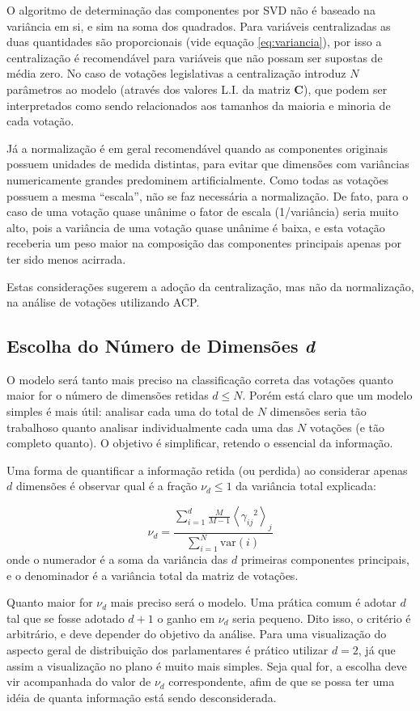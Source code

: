 \documentclass[a4paper, 12pt]{article}
\begin{document}
O algoritmo de determinação das componentes por SVD não é baseado na variância em si, e sim na soma dos quadrados. Para variáveis centralizadas as duas quantidades são proporcionais (vide equação \ref{eq:variancia}), por isso a centralização é recomendável para variáveis que não possam ser supostas de média zero. No caso de votações legislativas a centralização introduz $N$ parâmetros ao modelo (através dos valores L.I. da matriz $\mathbf{C}$), que podem ser interpretados como sendo relacionados aos tamanhos da maioria e minoria de cada votação.

Já a normalização é em geral recomendável quando as componentes originais possuem unidades de medida distintas, para evitar que dimensões com variâncias numericamente grandes predominem artificialmente. Como todas as votações possuem a mesma ``escala'', não se faz necessária a normalização. De fato, para o caso de uma votação quase unânime o fator de escala (1/variância) seria muito alto, pois a variância de uma votação quase unânime é baixa, e esta votação receberia um peso maior na composição das componentes principais apenas por ter sido menos acirrada.

Estas considerações sugerem a adoção da centralização, mas não da normalização, na análise de votações utilizando ACP.

\subsection*{Escolha do Número de Dimensões \emph{d}}

O modelo será tanto mais preciso na classificação correta das votações quanto maior for o número de dimensões retidas $d \leq N$. Porém está claro que um modelo simples é mais útil: analisar cada uma do total de $N$ dimensões seria tão trabalhoso quanto analisar individualmente cada uma das $N$ votações (e tão completo quanto). O objetivo é simplificar, retendo o essencial da informação.

Uma forma de quantificar a informação retida (ou perdida) ao considerar apenas $d$ dimensões é observar qual é a fração $\nu_d \leq 1$ da variância total explicada:

\[
\nu_d = \frac{\sum_{i=1}^{d}\frac{M}{M-1} \left< {\gamma_{ij}}^{2} \right>_j } {\sum_{i=1}^N \mathrm{var}(i)}
\]
onde o numerador é a soma da variância das $d$ primeiras componentes principais, e o denominador é a variância total da matriz de votações.

Quanto maior for $\nu_d$ mais preciso será o modelo. Uma prática comum é adotar $d$ tal que se fosse adotado $d+1$ o ganho em $\nu_d$ seria pequeno. Dito isso, o critério é arbitrário, e deve depender do objetivo da análise. Para uma visualização do aspecto geral de distribuição dos parlamentares é prático utilizar $d=2$, já que assim a visualização no plano é muito mais simples. Seja qual for, a escolha deve vir acompanhada do valor de $\nu_d$ correspondente, afim de que se possa ter uma idéia de quanta informação está sendo desconsiderada.
\end{document}
